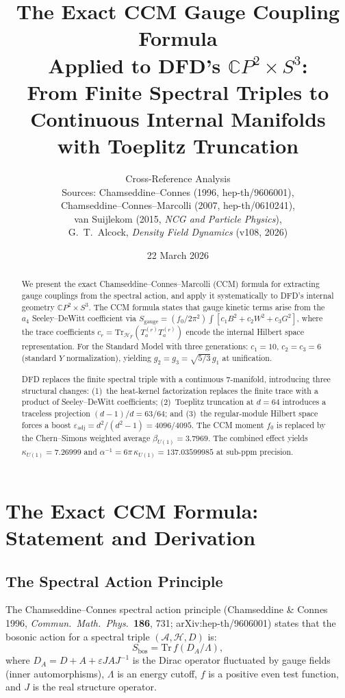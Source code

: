 \documentclass[12pt,a4paper]{article}
\title{The Exact CCM Gauge Coupling Formula\\
Applied to DFD's $\mathbb{C}P^2 \times S^3$:\\[6pt]
\large From Finite Spectral Triples to Continuous Internal Manifolds\\
with Toeplitz Truncation}
\author{Cross-Reference Analysis\\[4pt]
Sources: Chamseddine--Connes (1996, hep-th/9606001),\\
Chamseddine--Connes--Marcolli (2007, hep-th/0610241),\\
van Suijlekom (2015, \textit{NCG and Particle Physics}),\\
G.~T.~Alcock, \textit{Density Field Dynamics} (v108, 2026)}
\date{22 March 2026}
\begin{document}
\maketitle

\begin{abstract}
We present the exact Chamseddine--Connes--Marcolli (CCM) formula for
extracting gauge couplings from the spectral action, and apply it
systematically to DFD's internal geometry $\mathbb{C}P^2 \times S^3$.
The CCM formula states that gauge kinetic terms arise from the
$a_4$ Seeley--DeWitt coefficient via
$S_{\mathrm{gauge}} = (f_0/2\pi^2) \int [c_1 B^2 + c_2 W^2 + c_3 G^2]$,
where the trace coefficients $c_r = \mathrm{Tr}_{\mathcal{H}_F}(T^{(r)}_a T^{(r)}_a)$
encode the internal Hilbert space representation.  For the Standard Model
with three generations: $c_1 = 10$, $c_2 = c_3 = 6$ (standard $Y$ normalization),
yielding $g_2 = g_3 = \sqrt{5/3}\,g_1$ at unification.

DFD replaces the finite spectral triple with a continuous 7-manifold,
introducing three structural changes: (1)~the heat-kernel factorization
replaces the finite trace with a product of Seeley--DeWitt coefficients;
(2)~Toeplitz truncation at $d = 64$ introduces a traceless projection
$(d-1)/d = 63/64$; and (3)~the regular-module Hilbert space forces a
boost $\varepsilon_{\mathrm{adj}} = d^2/(d^2-1) = 4096/4095$.
The CCM moment $f_0$ is replaced by the Chern--Simons weighted average
$\beta_{U(1)} = 3.7969$.  The combined effect yields
$\kappa_{U(1)} = 7.26999$ and $\alpha^{-1} = 6\pi\,\kappa_{U(1)} = 137.03599985$
at sub-ppm precision.
\end{abstract}

\tableofcontents
\newpage

\section{The Exact CCM Formula: Statement and Derivation}
\label{sec:ccm-exact}

\subsection{The Spectral Action Principle}

The Chamseddine--Connes spectral action principle (Chamseddine \& Connes 1996,
\textit{Commun.\ Math.\ Phys.}\ \textbf{186}, 731; arXiv:hep-th/9606001)
states that the bosonic action for a spectral triple
$(\mathcal{A}, \mathcal{H}, D)$ is:
\begin{equation}\label{eq:spectral-action}
S_{\mathrm{bos}} = \mathrm{Tr}\,f(D_A/\Lambda),
\end{equation}
where $D_A = D + A + \varepsilon JAJ^{-1}$ is the Dirac operator fluctuated
by gauge fields (inner automorphisms), $\Lambda$ is an energy cutoff, $f$ is a
positive even test function, and $J$ is the real structure operator.
\end{document}

